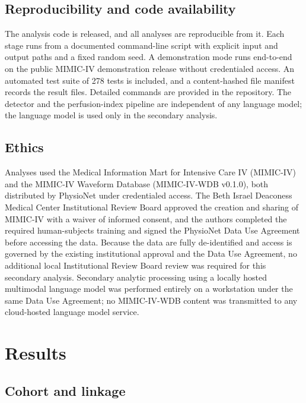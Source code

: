 \documentclass[twocolumn,letterpaper,10pt]{article}
\begin{document}
\subsection{Reproducibility and code availability}

The analysis code is released, and all analyses are reproducible from it. Each stage runs from a documented command-line script with explicit input and output paths and a fixed random seed. A demonstration mode runs end-to-end on the public MIMIC-IV demonstration release without credentialed access. An automated test suite of 278 tests is included, and a content-hashed file manifest records the result files. Detailed commands are provided in the repository. The detector and the perfusion-index pipeline are independent of any language model; the language model is used only in the secondary analysis.

\subsection{Ethics}

Analyses used the Medical Information Mart for Intensive Care IV (MIMIC-IV)\cite{johnson2023_mimic4} and the MIMIC-IV Waveform Database (MIMIC-IV-WDB v0.1.0),\cite{moody2022_wdb} both distributed by PhysioNet under credentialed access. The Beth Israel Deaconess Medical Center Institutional Review Board approved the creation and sharing of MIMIC-IV with a waiver of informed consent,\cite{johnson2023_mimic4} and the authors completed the required human-subjects training and signed the PhysioNet Data Use Agreement before accessing the data. Because the data are fully de-identified and access is governed by the existing institutional approval and the Data Use Agreement, no additional local Institutional Review Board review was required for this secondary analysis. Secondary analytic processing using a locally hosted multimodal language model was performed entirely on a workstation under the same Data Use Agreement; no MIMIC-IV-WDB content was transmitted to any cloud-hosted language model service.

\section{Results}

\subsection{Cohort and linkage}
\end{document}
